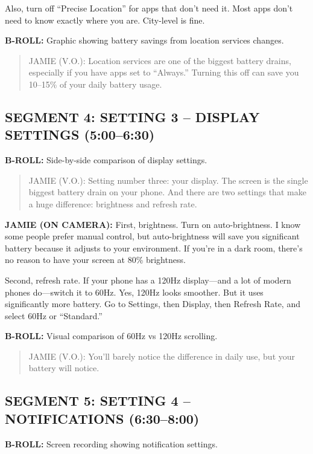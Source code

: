 \documentclass[
    language=english,
    doctype=video-script,
    institution=none,
]{../../omnilatex}
\begin{document}
Also, turn off ``Precise Location'' for apps that don't need it. Most apps don't need to know exactly where you are. City-level is fine.

\textbf{B-ROLL:} Graphic showing battery savings from location services changes.

\begin{quote}
JAMIE (V.O.): Location services are one of the biggest battery drains, especially if you have apps set to ``Always.'' Turning this off can save you 10--15\% of your daily battery usage.
\end{quote}

\subsection*{SEGMENT 4: SETTING 3 -- DISPLAY SETTINGS (5:00--6:30)}

\textbf{B-ROLL:} Side-by-side comparison of display settings.

\begin{quote}
JAMIE (V.O.): Setting number three: your display. The screen is the single biggest battery drain on your phone. And there are two settings that make a huge difference: brightness and refresh rate.
\end{quote}

\textbf{JAMIE (ON CAMERA):} First, brightness. Turn on auto-brightness. I know some people prefer manual control, but auto-brightness will save you significant battery because it adjusts to your environment. If you're in a dark room, there's no reason to have your screen at 80\% brightness.

Second, refresh rate. If your phone has a 120Hz display---and a lot of modern phones do---switch it to 60Hz. Yes, 120Hz looks smoother. But it uses significantly more battery. Go to Settings, then Display, then Refresh Rate, and select 60Hz or ``Standard.''

\textbf{B-ROLL:} Visual comparison of 60Hz vs 120Hz scrolling.

\begin{quote}
JAMIE (V.O.): You'll barely notice the difference in daily use, but your battery will notice.
\end{quote}

\subsection*{SEGMENT 5: SETTING 4 -- NOTIFICATIONS (6:30--8:00)}

\textbf{B-ROLL:} Screen recording showing notification settings.
\end{document}
